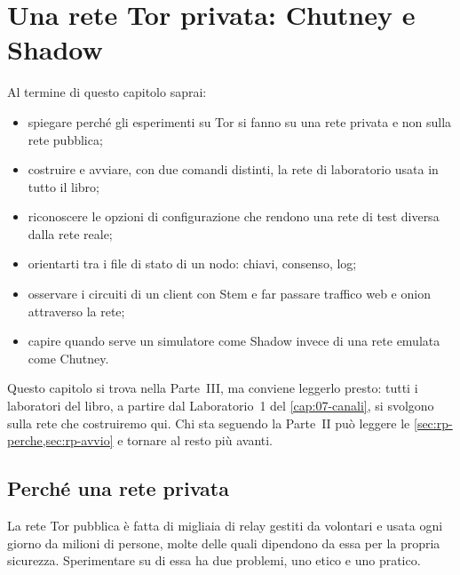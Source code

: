 \chapter{Una rete Tor privata: Chutney e Shadow}\label{cap:19-rete-privata}

\begin{obiettivi}
Al termine di questo capitolo saprai:
\begin{itemize}[nosep]
  \item spiegare perché gli esperimenti su Tor si fanno su una rete privata e non sulla rete pubblica;
  \item costruire e avviare, con due comandi distinti, la rete di laboratorio usata in tutto il libro;
  \item riconoscere le opzioni di configurazione che rendono una rete di test diversa dalla rete reale;
  \item orientarti tra i file di stato di un nodo: chiavi, consenso, log;
  \item osservare i circuiti di un client con Stem e far passare traffico web e onion attraverso la rete;
  \item capire quando serve un simulatore come Shadow invece di una rete emulata come Chutney.
\end{itemize}
\end{obiettivi}

Questo capitolo si trova nella Parte~III, ma conviene leggerlo presto: tutti i laboratori del libro, a partire dal Laboratorio~1 del \cref{cap:07-canali}, si svolgono sulla rete che costruiremo qui. Chi sta seguendo la Parte~II può leggere le \cref{sec:rp-perche,sec:rp-avvio} e tornare al resto più avanti.

\section{Perché una rete privata}\label{sec:rp-perche}

La rete Tor pubblica è fatta di migliaia di relay gestiti da volontari e usata ogni giorno da milioni di persone, molte delle quali dipendono da essa per la propria sicurezza. Sperimentare su di essa ha due problemi, uno etico e uno pratico.

